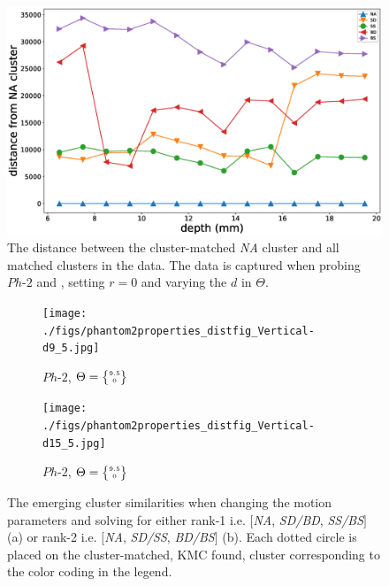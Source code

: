 \documentclass[]{interact}
\theoremstyle{plain}%
\theoremstyle{definition}
\theoremstyle{remark}
\begin{document}
\begin{figure}[]
	\centering
	\includegraphics[width=.75\textwidth]{./figs/phantom2propertiesVertical_na-dist}
	\caption{The distance between the cluster-matched \textit{NA} cluster and all matched clusters in the data. 
		The data is captured when probing $Ph\text{-}2$ and , setting $r=0$ and varying the $d$ in $\Theta$.}
	\label{na_dist}
\end{figure}


\begin{figure}[]
	\centering
	\begin{subfigure}[b]{.48\textwidth}
		\texttt{[image: ./figs/phantom2properties\_distfig\_Vertical-d9\_5.jpg]}
		\caption{$Ph\text{-}2$, $\Theta = \tiny{\begin{Bmatrix}9.5\\ 0\end{Bmatrix}}$}
		\label{cluster_distance:ph1-1}
	\end{subfigure}
	\begin{subfigure}[b]{.48\textwidth}
		\texttt{[image: ./figs/phantom2properties\_distfig\_Vertical-d15\_5.jpg]}
		\caption{$Ph\text{-}2$, $\Theta = \tiny{\begin{Bmatrix}9.5\\ 0\end{Bmatrix}}$}
		\label{cluster_distance:ph1-2}
	\end{subfigure}
	\caption{The emerging cluster similarities when changing the motion parameters and 
		solving for either rank-1 i.e. $[$\textit{NA}, \textit{SD/BD}, 
		\textit{SS/BS}$]$ (a) or rank-2 i.e. $[$\textit{NA}, \textit{SD/SS}, \textit{BD/BS}$]$ (b). 
		Each dotted circle is placed on the cluster-matched, KMC found, cluster corresponding to the color 
		coding in the legend.}
	\label{cluster_distance}
\end{figure}
\end{document}
